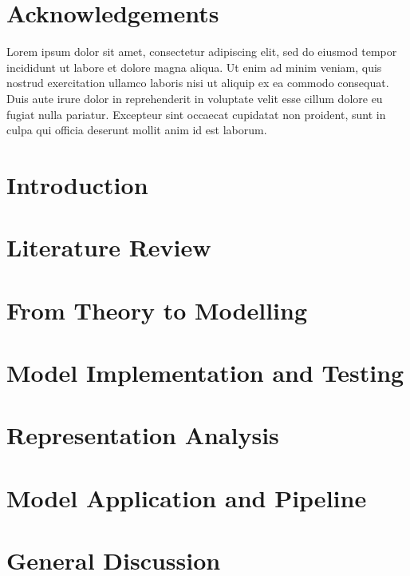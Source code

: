 \documentclass{yorkThesis}
\newcommand{\lorem}{Lorem ipsum dolor sit amet, consectetur adipiscing elit, sed do eiusmod tempor incididunt ut labore et dolore magna aliqua. Ut enim ad minim veniam, quis nostrud exercitation ullamco laboris nisi ut aliquip ex ea commodo consequat. Duis aute irure dolor in reprehenderit in voluptate velit esse cillum dolore eu fugiat nulla pariatur. Excepteur sint occaecat cupidatat non proident, sunt in culpa qui officia deserunt mollit anim id est laborum.\\}
\begin{document}
\chapter*{Acknowledgements}
\lorem

\tableofcontents


\chapter{Introduction}
\label{chapter_intro}


\chapter{Literature Review}
\label{chapter_lit_review}


\chapter{From Theory to Modelling}
\label{chapter_theory_modelling}


\chapter{Model Implementation and Testing}
\label{chapter_implementation_testing}


\chapter{Representation Analysis}
\label{chapter_repr_anal}


\chapter{Model Application and Pipeline}
\label{chapter_appliction}


\chapter{General Discussion}
\label{chapter_general_discussion}




\end{document}
